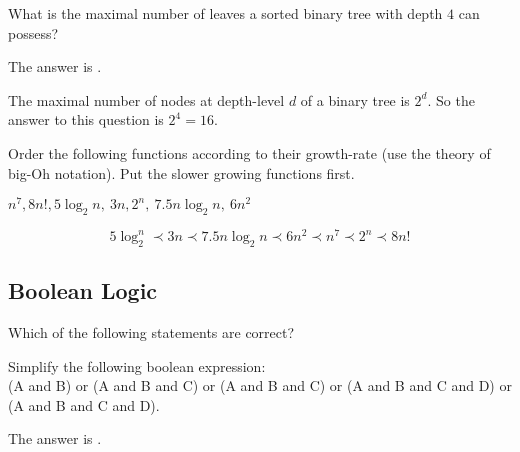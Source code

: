 \documentclass{ximera}
\begin{document}
\begin{question}
What is the maximal number of leaves a sorted binary tree with depth $4$ can possess?
\begin{solution}
The answer is .
\end{solution}
The maximal number of nodes at depth-level $d$ of a binary tree is $2^d$. So the answer to this question is $2^4 = 16$. 
\end{question}

\begin{question}
Order the following functions according to their growth-rate (use the theory of big-Oh notation). Put the slower growing functions first.

$ n^7, 8n!, 5 \log_2 n,~ 3n, 2^n, ~ 7.5 n\log_2 n, ~ 6 n^2$ 

\begin{solution}
\end{solution}
\begin{equation*}
5 \log_2^n \prec 3n \prec 7.5 n \log_2{n} \prec 6n^2 \prec n^7 \prec 2^n \prec 8n!
\end{equation*}
\end{question}

\subsection*{Boolean Logic}

\begin{question}
Which of the following statements are correct?
\begin{solution}
\begin{multiple-choice}
\end{multiple-choice}
\end{solution}
\end{question}

\begin{question}
Simplify the following boolean expression: \\
(A and B) or (A and B and C) or (A and B and C) or (A and B and C and D) or (A and B and C and D).
\begin{solution}
The answer is . 
\end{solution}
\end{question}
\end{document}
